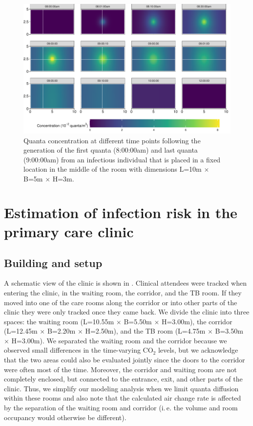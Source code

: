 \documentclass[fleqn,11pt]{wlscirep_supp}
\newcommand\ie{i.\,e.\xspace}
\begin{document}
\begin{figure}[!htpb]
    \centering
    \includegraphics{../../tests/stm_v2-toy_example.pdf}
    \caption{Quanta concentration at different time points following the generation of the first quanta (8:00:00am) and last quanta (9:00:00am) from an infectious individual that is placed in a fixed location in the middle of the room with dimensions L=10m $\times$ B=5m $\times$ H=3m.}
    \label{fig:toy-example}
\end{figure}

\clearpage


\section{Estimation of infection risk in the primary care clinic}\label{sec:estimation}

\subsection{Building and setup}\label{prep:building}

A schematic view of the clinic is shown in . Clinical attendees were tracked when entering the clinic, in the waiting room, the corridor, and the TB room. If they moved into one of the care rooms along the corridor or into other parts of the clinic they were only tracked once they came back. We divide the clinic into three spaces: the waiting room (L=10.55m $\times$ B=5.50m $\times$ H=3.00m), the corridor (L=12.45m $\times$ B=2.20m $\times$ H=2.50m), and the TB room (L=4.75m $\times$ B=3.50m $\times$ H=3.00m). We separated the waiting room and the corridor because we observed small differences in the time-varying CO$_2$ levels, but we acknowledge that the two areas could also be evaluated jointly since the doors to the corridor were often most of the time. Moreover, the corridor and waiting room are not completely enclosed, but connected to the entrance, exit, and other parts of the clinic. Thus, we simplify our modeling analysis when we limit quanta diffusion within these rooms and also note that the calculated air change rate is affected by the separation of the waiting room and corridor (\ie the volume and room occupancy would otherwise be different). 
\end{document}
